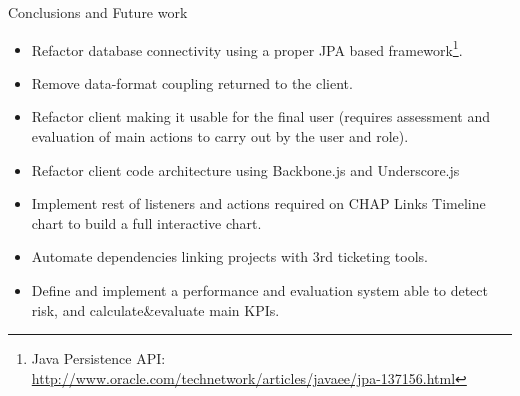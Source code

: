 \begin{part}{Conclusions and Future work}
\begin{itemize}
	\item Refactor database connectivity using a proper JPA based
	framework\footnote{Java Persistence API:
	\url{http://www.oracle.com/technetwork/articles/javaee/jpa-137156.html}}.
	\item Remove data-format coupling returned to the client.
	\item Refactor client making it usable for the final user (requires assessment
	and evaluation of main actions to carry out by the user and role).
	\item Refactor client code architecture using Backbone.js and Underscore.js
	\item Implement rest of listeners and actions required on CHAP Links Timeline
	chart to build a full interactive chart.
	\item Automate dependencies linking projects with 3rd ticketing tools.
	\item Define and implement a performance and evaluation system able to detect
	risk, and calculate&evaluate main KPIs.
\end{itemize}
\end{part}
